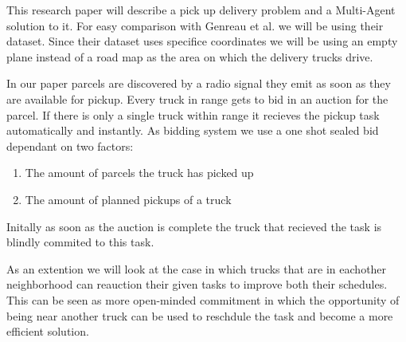 \documentclass[../main.tex]{subfiles}
\begin{document}
This research paper will describe a pick up delivery problem and a Multi-Agent solution to it.
For easy comparison with Genreau et al. we will be using their dataset.
Since their dataset uses specifice coordinates we will be using an empty plane instead of a road map as the area on which the delivery trucks drive.

In our paper parcels are discovered by a radio signal they emit as soon as they are available for pickup.
Every truck in range gets to bid in an auction for the parcel. 
If there is only a single truck within range it recieves the pickup task automatically and instantly.
As bidding system we use a one shot sealed bid dependant on two factors: 
\begin{enumerate}
	\item The amount of parcels the truck has picked up  
	\item The amount of planned pickups of a truck
\end{enumerate}
Initally as soon as the auction is complete the truck that recieved the task is blindly commited to this task.

As an extention we will look at the case in which trucks that are in eachother neighborhood can reauction their given tasks to improve both their schedules.
This can be seen as more open-minded commitment in which the opportunity of being near another truck can be used to reschdule the task and become a more efficient solution.
\end{document}
